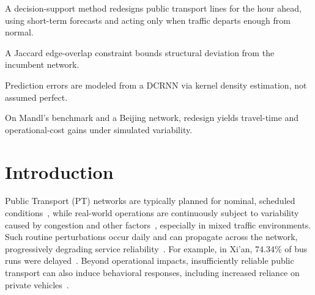 \documentclass[a4paper,fleqn]{cas-sc}
\begin{document}

\begin{highlights}
\item A decision-support method redesigns public transport lines for the hour ahead, using short-term forecasts and acting only when traffic departs enough from normal.
\item A Jaccard edge-overlap constraint bounds structural deviation from the incumbent network.
\item Prediction errors are modeled from a DCRNN via kernel density estimation, not assumed perfect.
\item On Mandl's benchmark and a Beijing network, redesign yields travel-time and operational-cost gains under simulated variability.
\end{highlights}


\begin{keywords}
\end{keywords}

\maketitle

\section{Introduction}

Public Transport (PT) networks are typically planned for nominal, scheduled conditions~\citep{ibarra2015planning}, while real-world operations are continuously subject to variability caused by congestion and other factors~\citep{buchel2020review, danaher2020minutes}, especially in mixed traffic environments. Such routine perturbations occur daily and can propagate across the network, progressively degrading service reliability~\citep{marra2020delay}. For example, in Xi’an, 74.34\% of bus runs were delayed~\citep{zhang2022travel}. 
Beyond operational impacts, insufficiently reliable public transport can also induce behavioral responses, including increased reliance on private vehicles~\citep{rodier2025evaluation}.
\end{document}

